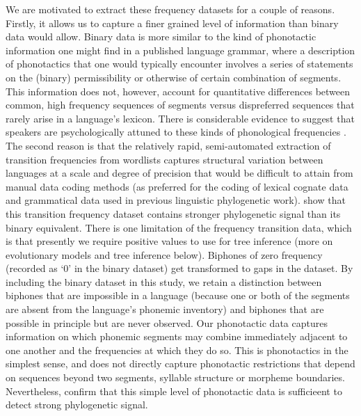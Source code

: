 We are motivated to extract these frequency datasets for a couple of reasons. Firstly, it allows us to capture a finer grained level of information than binary data would allow. Binary data is more similar to the kind of phonotactic information one might find in a published language grammar, where a description of phonotactics that one would typically encounter involves a series of statements on the (binary) permissibility or otherwise of certain combination of segments. This information does not, however, account for quantitative differences between common, high frequency sequences of segments versus dispreferred sequences that rarely arise in a language's lexicon. There is considerable evidence to suggest that speakers are psychologically attuned to these kinds of phonological frequencies \autocites{coleman_stochastic_1997}{zuraw_patterned_2000}{ernestus_predicting_2003}{albright_rules_2003}{eddington_spanish_2004}{hayes_stochastic_2006}{gordon_phonological_2016}. The second reason is that the relatively rapid, semi-automated extraction of transition frequencies from wordlists captures structural variation between languages at a scale and degree of precision that would be difficult to attain from manual data coding methods (as preferred for the coding of lexical cognate data and grammatical data used in previous linguistic phylogenetic work). \textcite{macklin-cordes_phylogenetic_2020} show that this transition frequency dataset contains stronger phylogenetic signal than its binary equivalent. There is one limitation of the frequency transition data, which is that presently we require positive values to use for tree inference (more on evolutionary models and tree inference below). Biphones of zero frequency (recorded as `0' in the binary dataset) get transformed to gaps in the dataset. By including the binary dataset in this study, we retain a distinction between biphones that are impossible in a language (because one or both of the segments are absent from the language's phonemic inventory) and biphones that are possible in principle but are never observed. Our phonotactic data captures information on which phonemic segments may combine immediately adjacent to one another and the frequencies at which they do so. This is phonotactics in the simplest sense, and does not directly capture phonotactic restrictions that depend on sequences beyond two segments, syllable structure or morpheme boundaries. Nevertheless, \textcite{macklin-cordes_phylogenetic_2020} confirm that this simple level of phonotactic data is sufficieent to detect strong phylogenetic signal.

